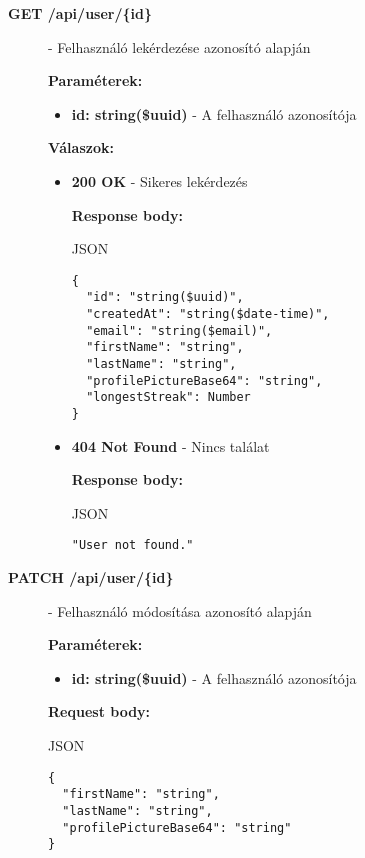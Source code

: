 \documentclass[12pt]{report}
\begin{document}
\begin{description}
  \item[\textbf{GET /api/user/\{id\}}] - Felhasználó lekérdezése azonosító alapján

    \vspace{0.5cm}
    \textbf{Paraméterek:}
    \begin{itemize}
      \item \textbf{id: string(\$uuid)} - A felhasználó azonosítója
    \end{itemize}

    \vspace{0.5cm}
    \textbf{Válaszok:}
    \begin{itemize}
      \item \textbf{200 OK} - Sikeres lekérdezés

        \textbf{Response body:}
        \begin{codeblock}{JSON}
          \begin{verbatim}
{
  "id": "string($uuid)",
  "createdAt": "string($date-time)",
  "email": "string($email)",
  "firstName": "string",
  "lastName": "string",
  "profilePictureBase64": "string",
  "longestStreak": Number
}
          \end{verbatim}
        \end{codeblock}
      \item \textbf{404 Not Found} - Nincs találat

        \textbf{Response body:}
        \begin{codeblock}{JSON}
          \begin{verbatim}
"User not found."
          \end{verbatim}
        \end{codeblock}
    \end{itemize}

    \item[\textbf{PATCH /api/user/\{id\}}] - Felhasználó módosítása azonosító alapján

    \vspace{0.5cm}
    \textbf{Paraméterek:}
    \begin{itemize}
      \item \textbf{id: string(\$uuid)} - A felhasználó azonosítója
    \end{itemize}

    \vspace{0.5cm}
    \textbf{Request body:}
    \begin{codeblock}{JSON}
      \begin{verbatim}
{
  "firstName": "string",
  "lastName": "string",
  "profilePictureBase64": "string"
}
      \end{verbatim}
    \end{codeblock}


\end{description}
\end{document}
